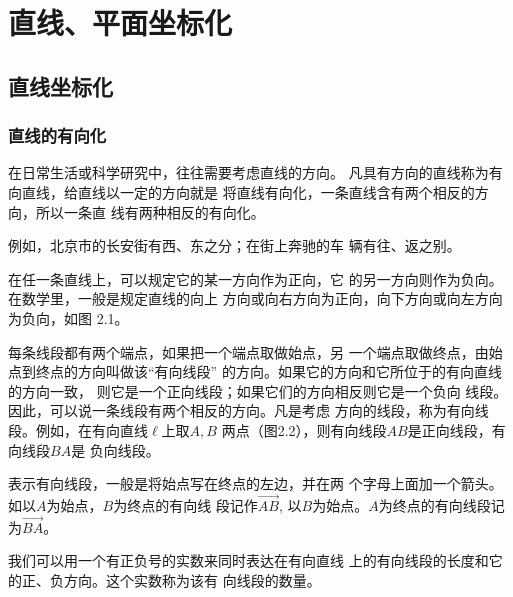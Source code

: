 \chapter{直线、平面坐标化}
\section{直线坐标化}

\subsection{直线的有向化}
在日常生活或科学研究中，往往需要考虑直线的方向。
凡具有方向的直线称为有向直线，给直线以一定的方向就是
将直线有向化，一条直线含有两个相反的方向，所以一条直
线有两种相反的有向化。

例如，北京市的长安街有西、东之分；在街上奔驰的车
辆有往、返之别。

在任一条直线上，可以规定它的某一方向作为正向，它
的另一方向则作为负向。在数学里，一般是规定直线的向上
方向或向右方向为正向，向下方向或向左方向为负向，如图
2.1。
\begin{figure}[htp]
    \centering
{}
    \caption{}
\end{figure}

每条线段都有两个端点，如果把一个端点取做始点，另
一个端点取做终点，由始点到终点的方向叫做该“有向线段”
的方向。如果它的方向和它所位于的有向直线的方向一致，
则它是一个正向线段；如果它们的方向相反则它是一个负向
线段。因此，可以说一条线段有两个相反的方向。凡是考虑
方向的线段，称为有向线段。例如，在有向直线$\ell$上取$A,B$
两点（图2.2），则有向线段$AB$是正向线段，有向线段$BA$是
负向线段。
\begin{figure}[htp]
    \centering
{}
    \caption{}
\end{figure}

表示有向线段，一般是将始点写在终点的左边，并在两
个字母上面加一个箭头。如以$A$为始点，$B$为终点的有向线
段记作$\Vec{AB}$, 以$B$为始点。$A$为终点的有向线段记为$\Vec{BA}$。

我们可以用一个有正负号的实数来同时表达在有向直线
上的有向线段的长度和它的正、负方向。这个实数称为该有
向线段的数量。

